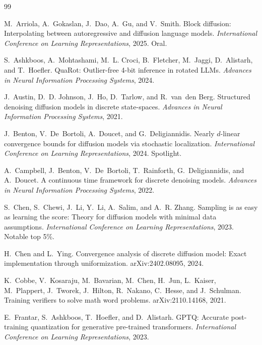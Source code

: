 \small

\begin{thebibliography}{99}

M.~Arriola, A.~Gokaslan, J.~Dao, A.~Gu, and V.~Smith.
Block diffusion: Interpolating between autoregressive and diffusion language models.
\emph{International Conference on Learning Representations}, 2025. Oral.

S.~Ashkboos, A.~Mohtashami, M.~L. Croci, B.~Fletcher, M.~Jaggi, D.~Alistarh, and T.~Hoefler.
QuaRot: Outlier-free 4-bit inference in rotated LLMs.
\emph{Advances in Neural Information Processing Systems}, 2024.

J.~Austin, D.~D. Johnson, J.~Ho, D.~Tarlow, and R.~van~den Berg.
Structured denoising diffusion models in discrete state-spaces.
\emph{Advances in Neural Information Processing Systems}, 2021.

J.~Benton, V.~De~Bortoli, A.~Doucet, and G.~Deligiannidis.
Nearly $d$-linear convergence bounds for diffusion models via stochastic localization.
\emph{International Conference on Learning Representations}, 2024. Spotlight.

A.~Campbell, J.~Benton, V.~De~Bortoli, T.~Rainforth, G.~Deligiannidis, and A.~Doucet.
A continuous time framework for discrete denoising models.
\emph{Advances in Neural Information Processing Systems}, 2022.

S.~Chen, S.~Chewi, J.~Li, Y.~Li, A.~Salim, and A.~R. Zhang.
Sampling is as easy as learning the score: Theory for diffusion models with minimal data assumptions.
\emph{International Conference on Learning Representations}, 2023. Notable top 5\%.

H.~Chen and L.~Ying.
Convergence analysis of discrete diffusion model: Exact implementation through uniformization.
arXiv:2402.08095, 2024.

K.~Cobbe, V.~Kosaraju, M.~Bavarian, M.~Chen, H.~Jun, L.~Kaiser, M.~Plappert, J.~Tworek, J.~Hilton, R.~Nakano, C.~Hesse, and J.~Schulman.
Training verifiers to solve math word problems.
arXiv:2110.14168, 2021.

E.~Frantar, S.~Ashkboos, T.~Hoefler, and D.~Alistarh.
GPTQ: Accurate post-training quantization for generative pre-trained transformers.
\emph{International Conference on Learning Representations}, 2023.


\end{thebibliography}
